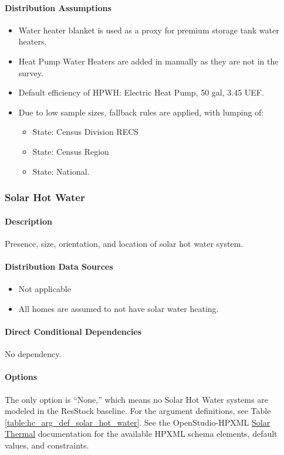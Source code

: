 \paragraph{Distribution Assumptions}\label{assumption-83}
\begin{itemize}
\item
  Water heater blanket is used as a proxy for premium storage tank water
  heaters.
\item
  Heat Pump Water Heaters are added in manually as they are not in the
  survey.
\item
  Default efficiency of HPWH: Electric Heat Pump, 50 gal, 3.45 UEF.
\item
  Due to low sample sizes, fallback rules are applied, with lumping of:
  
  \begin{itemize}
  \item
    State: Census Division RECS
  \item
    State: Census Region
    \item
    State: National.
  \end{itemize}
\end{itemize}

\subsubsection{Solar Hot Water}\label{solar_hot_water}
\paragraph{Description}
Presence, size, orientation, and location of solar hot water system. 

\paragraph{Distribution Data Sources}
\begin{itemize}
\item
  Not applicable
\item
  All homes are assumed to not have solar water heating.
\end{itemize}

\paragraph{Direct Conditional Dependencies}
No dependency.

\paragraph{Options}
The only option is ``None,'' which means no Solar Hot Water systems are modeled in the ResStock baseline. For the argument definitions, see Table \ref{table:hc_arg_def_solar_hot_water}. See the OpenStudio-HPXML \href{https://openstudio-hpxml.readthedocs.io/en/v1.8.1/workflow_inputs.html#hpxml-solar-thermal}{Solar Thermal} documentation for the available HPXML schema elements, default values, and constraints.

